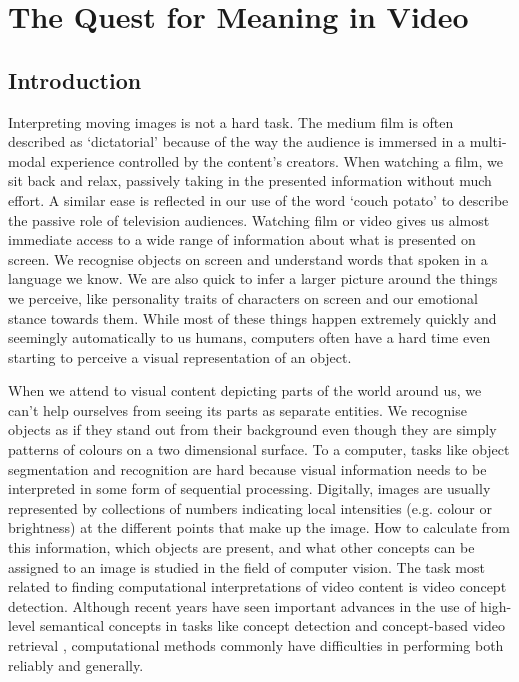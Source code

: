 \chapter{The Quest for Meaning in Video}
\label{ch:quest}

\section{Introduction} %
\label{sec:introduction}

Interpreting moving images is not a hard task. The medium film is often described as `dictatorial' because of the way the audience is immersed in a multi-modal experience controlled by the content's creators. When watching a film, we sit back and relax, passively taking in the presented information without much effort. A similar ease is reflected in our use of the word `couch potato' to describe the passive role of television audiences. Watching film or video gives us almost immediate access to a wide range of information about what is presented on screen. We recognise objects on screen and understand words that spoken in a language we know. We are also quick to infer a larger picture around the things we perceive, like personality traits of characters on screen and our emotional stance towards them. While most of these things happen extremely quickly and seemingly automatically to us humans, computers often have a hard time even starting to perceive a visual representation of an object.

When we attend to visual content depicting parts of the world around us, we can't help ourselves from seeing its parts as separate entities. We recognise objects as if they stand out from their background even though they are simply patterns of colours on a two dimensional surface. To a computer, tasks like object segmentation and recognition are hard because visual information needs to be interpreted in some form of sequential processing. Digitally, images are usually represented by collections of numbers indicating local intensities (e.g. colour or brightness) at the different points that make up the image. How to calculate from this information, which objects are present, and what other concepts can be assigned to an image is studied in the field of computer vision. The task most related to finding computational interpretations of video content is video concept detection. Although recent years have seen important advances in the use of high-level semantical concepts in tasks like concept detection and concept-based video retrieval \cite{Snoek:2009dq, Snoek:jf, Worring:2007vm, Chang:2008wh}, computational methods commonly have difficulties in performing both reliably and generally.

